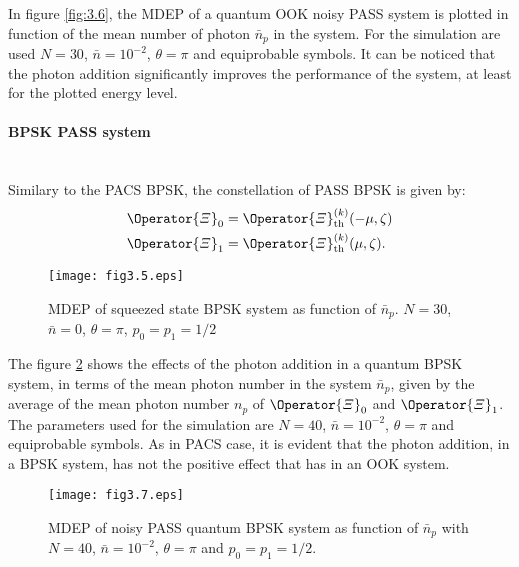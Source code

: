         In figure \ref{fig:3.6}, the MDEP of a quantum OOK noisy PASS system is plotted in function
        of the mean number of photon $\bar{n}_p$ in the system. For the simulation are used $N=30$, $\bar{n}=10^{-2}$, $\theta=\pi$ and
        equiprobable symbols.
        It can be noticed that the photon addition significantly improves the performance of the system,
        at least for the plotted energy level.
        
        \paragraph{BPSK PASS system}\mbox{}\\
        Similary to the PACS BPSK, the constellation of PASS BPSK is given by:
        \begin{subequations}
            \begin{align}
                \Operator{\varXi}_0 &= \Operator{\varXi}_{\mathrm{th}}^{(k)}(-\mu,\zeta)\\
                \Operator{\varXi}_1 &= \Operator{\varXi}_{\mathrm{th}}^{(k)}(\mu,\zeta).
            \end{align}
        \end{subequations}
        \begin{figure}[t]
            \begin{center}
                \texttt{[image: fig3.5.eps]}
                \caption{MDEP of squeezed state BPSK system as function of $\bar{n}_p$. 
                    $N=30$, $\bar{n}=0$, $\theta=\pi$, $p_0=p_1=1/2$}
                \label{fig:3.5}
            \end{center}     
        \end{figure}
        The figure \ref{fig:3.7} shows the effects of the photon addition in a quantum BPSK
        system, in terms of the mean photon number in the system $\bar{n}_p$, given by the average of 
        the mean photon number $n_p$ of $\Operator{\varXi}_0$ and $\Operator{\varXi}_1$. The parameters used
        for the simulation are $N=40$, $\bar{n}=10^{-2}$, $\theta=\pi$ and equiprobable symbols.
        As in PACS case, it is evident that the photon addition, in a BPSK system, has not
        the positive effect that has in an OOK system.
        \begin{figure}[t]
            \begin{center}
                \texttt{[image: fig3.7.eps]}
                \caption{MDEP of noisy PASS quantum BPSK system as function of $\bar{n}_p$ with
                $N=40$, $\bar{n}=10^{-2}$, $\theta=\pi$ and $p_0=p_1=1/2$.}
                \label{fig:3.7}
            \end{center}
        \end{figure}
